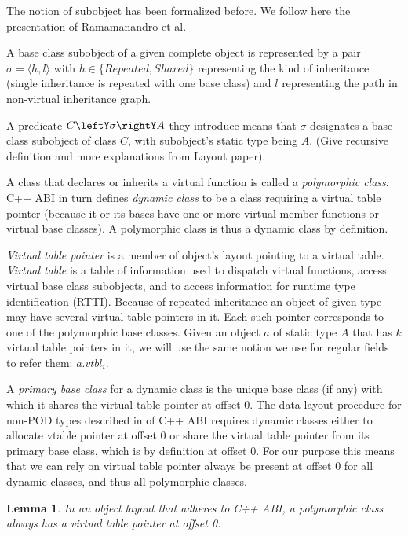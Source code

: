 \documentclass[preprint]{sigplanconf}
\newtheorem{lemma}{Lemma}
\begin{document}
The notion of subobject has been formalized before\cite{RF95,WNST06,RDL11}.
We follow here the presentation of Ramamanandro et al\cite{RDL11}.

A base class subobject of a given complete object is represented by a pair 
$\sigma = \langle h,l\rangle$ with $h \in \{Repeated,Shared\}$ representing the 
kind of inheritance (single inheritance is repeated with one base class) and $l$ 
representing the path in non-virtual inheritance graph.

A predicate $C\leftY\sigma\rightY A$ they introduce means that $\sigma$ 
designates a base class subobject of class $C$, with subobject's static type 
being $A$. (Give recursive definition and more explanations from Layout paper).

A class that declares or inherits a virtual function is called a 
\emph{polymorphic class}\cite[]{C++0x}. C++ ABI in turn defines 
\emph{dynamic class} to be a class requiring a virtual table pointer (because it 
or its bases have one or more virtual member functions or virtual base classes). 
A polymorphic class is thus a dynamic class by definition.

\emph{Virtual table pointer} is a member of object's layout pointing to a 
virtual table. \emph{Virtual table} is a table of information used to dispatch 
virtual functions, access virtual base class subobjects, and to access 
information for runtime type identification (RTTI). Because of repeated 
inheritance an object of given type may have several virtual table pointers in 
it. Each such pointer corresponds to one of the polymorphic base classes. Given 
an object $a$ of static type $A$ that has $k$ virtual table pointers in it, we 
will use the same notion we use for regular fields to refer them: $a.vtbl_i$. 

A \emph{primary base class} for a dynamic class is the unique base class (if any) 
with which it shares the virtual table pointer at offset 0. The data layout 
procedure for non-POD types described in  of C++ ABI 
requires dynamic classes either to allocate vtable pointer at offset 0 or share 
the virtual table pointer from its primary base class, which is by definition at 
offset 0. For our purpose this means that we can rely on virtual table pointer 
always be present at offset 0 for all dynamic classes, and thus all polymorphic 
classes.

\begin{lemma}
In an object layout that adheres to C++ ABI, a polymorphic class always has a 
virtual table pointer at offset 0.
\label{lem:vtbl}
\end{lemma}
\end{document}
